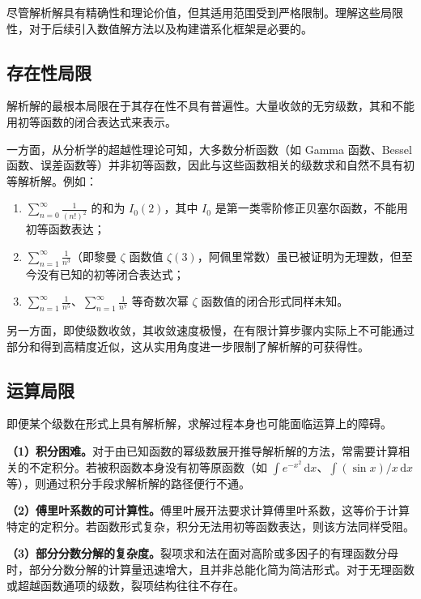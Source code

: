 尽管解析解具有精确性和理论价值，但其适用范围受到严格限制。理解这些局限性，对于后续引入数值解方法以及构建谱系化框架是必要的。

\subsection{存在性局限}

解析解的最根本局限在于其存在性不具有普遍性。大量收敛的无穷级数，其和不能用初等函数的闭合表达式来表示。

一方面，从分析学的超越性理论可知，大多数分析函数（如 Gamma 函数、Bessel 函数、误差函数等）并非初等函数，因此与这些函数相关的级数求和自然不具有初等解析解。例如：
\begin{enumerate}[label=（\arabic*）]
  \item $\displaystyle\sum_{n=0}^{\infty} \frac{1}{(n!)^2}$ 的和为 $I_0(2)$，其中 $I_0$ 是第一类零阶修正贝塞尔函数，不能用初等函数表达；
  \item $\displaystyle\sum_{n=1}^{\infty} \frac{1}{n^3}$（即黎曼 $\zeta$ 函数值 $\zeta(3)$，阿佩里常数）虽已被证明为无理数，但至今没有已知的初等闭合表达式；
  \item $\displaystyle\sum_{n=1}^{\infty} \frac{1}{n^5}$、$\displaystyle\sum_{n=1}^{\infty} \frac{1}{n^7}$ 等奇数次幂 $\zeta$ 函数值的闭合形式同样未知。
\end{enumerate}

另一方面，即使级数收敛，其收敛速度极慢，在有限计算步骤内实际上不可能通过部分和得到高精度近似，这从实用角度进一步限制了解析解的可获得性。

\subsection{运算局限}

即便某个级数在形式上具有解析解，求解过程本身也可能面临运算上的障碍。

\textbf{（1）积分困难。}对于由已知函数的幂级数展开推导解析解的方法，常需要计算相关的不定积分。若被积函数本身没有初等原函数（如 $\displaystyle \int e^{-x^2}\, \mathrm{d}x$、$\displaystyle \int (\sin x)/x\, \mathrm{d}x$ 等），则通过积分手段求解析解的路径便行不通。

\textbf{（2）傅里叶系数的可计算性。}傅里叶展开法要求计算傅里叶系数，这等价于计算特定的定积分。若函数形式复杂，积分无法用初等函数表达，则该方法同样受阻。

\textbf{（3）部分分数分解的复杂度。}裂项求和法在面对高阶或多因子的有理函数分母时，部分分数分解的计算量迅速增大，且并非总能化简为简洁形式。对于无理函数或超越函数通项的级数，裂项结构往往不存在。

